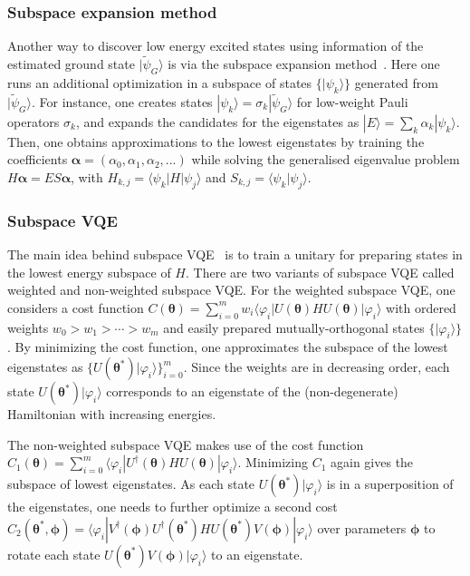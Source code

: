 \documentclass[prx,twocolumn,floatfix,superscriptaddress,longbibliography]{revtex4-1}
\renewcommand{\vec}[1]{\boldsymbol{#1}}  %
\newcommand{\<}{\langle}
\renewcommand{\>}{\rangle}
\newcommand{\ket}[1]{|#1\rangle}               %
\newcommand{\bra}[1]{\langle #1|}              %
\renewcommand{\vec}[1]{\boldsymbol{#1}}  %
\newcommand{\ad}{^\dagger}
\begin{document}
\subsubsection{ Subspace expansion method}    Another way to discover low energy excited states using information of the estimated ground state $\ket{\tilde{\psi}_G}$ is via the subspace expansion method~\cite{mcclean2017hybrid}. Here one runs an additional optimization in a  subspace of states $\{ \ket{\psi_k} \}$ generated from $\ket{\tilde{\psi}_G}$. For instance, one creates states $\ket{\psi_k} = \sigma_k \ket{\tilde{\psi}_G}$ for low-weight Pauli operators $\sigma_k$, and expands the candidates for the eigenstates as $\ket{E}=\sum_k \alpha_k \ket{\psi_k}$. Then, one obtains approximations to the lowest eigenstates by training the  coefficients $\vec{\alpha}=(\alpha_0, \alpha_1, \alpha_2,...)$ while solving the generalised eigenvalue problem $H \vec{\alpha}= E S \vec{\alpha}$, with $H_{k,j}= \bra{\psi_k} H \ket{\psi_j}$ and $S_{k,j}=\langle \psi_k| \psi_j \rangle$. 



\subsubsection{ Subspace VQE} The main idea behind subspace VQE~\cite{nakanishi2019subspace} is to train a unitary for preparing states in the lowest energy subspace of $H$. There are two variants of subspace VQE called weighted and non-weighted subspace VQE. 
For the weighted subspace VQE, one considers a cost function 
$C(\vec{\theta})=\sum_{i=0}^m w_i \bra{\varphi_i}U(\vec{\theta}) H U (\vec{\theta}) \ket{\varphi_i}$ with ordered weights $w_0>w_1> \cdots > w_m$ and easily prepared mutually-orthogonal states $\{\ket{\varphi_i}\}$. By minimizing the cost function, one approximates the subspace of the lowest eigenstates as $\{ U(\vec{\theta}^*) \ket{\varphi_i}\}_{i=0}^m$. Since the weights are in decreasing order, each state $U(\vec{\theta}^*) \ket{\varphi_i}$ corresponds to an eigenstate of the (non-degenerate) Hamiltonian with increasing energies. 

The non-weighted subspace VQE makes use of the cost function $C_1(\vec{\theta})=\sum_{i=0}^m \bra{\varphi_i}U\ad(\vec{\theta}) H U (\vec{\theta}) \ket{\varphi_i}$. Minimizing $C_1$ again gives the subspace of lowest eigenstates. As each state $U(\vec{\theta}^*) \ket{\varphi_i}$ is in a superposition of the eigenstates, one needs to  further optimize a  second cost $C_2(\vec{\theta}^*,\vec{\phi})=\bra{\varphi_i} V\ad(\vec{\phi}) U\ad(\vec{\theta}^*) H U (\vec{\theta}^*) V(\vec{\phi}) \ket{\varphi_i}$ over parameters $\vec \phi$ to rotate each state $U (\vec{\theta}^*) V(\vec{\phi}) \ket{\varphi_i}$ to an eigenstate.
\end{document}
